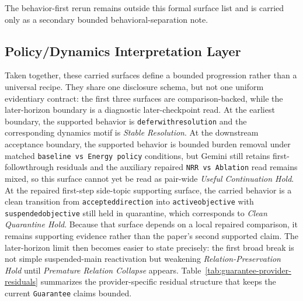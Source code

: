\documentclass[11pt]{article}
\renewcommand{\_}{\textunderscore\hspace{0pt}}
\begin{document}
The behavior-first rerun remains outside this formal surface list and is
carried only as a secondary bounded behavioral-separation note.

\subsection{Policy/Dynamics Interpretation Layer}

Taken together, these carried surfaces define a bounded progression rather than
a universal recipe. They share one disclosure schema, but not one uniform
evidentiary contract: the first three surfaces are comparison-backed, while the
later-horizon boundary is a diagnostic later-checkpoint read. At the earliest
boundary, the supported behavior is
\texttt{defer\_with\_resolution} and the corresponding dynamics motif is
\textit{Stable Resolution}. At the downstream acceptance boundary, the
supported behavior is bounded burden removal under matched \texttt{baseline vs
Energy policy} conditions, but Gemini still retains first-followthrough
residuals and the auxiliary repaired \texttt{NRR vs Ablation} read remains
mixed, so this surface cannot yet be read as pair-wide \textit{Useful
Continuation Hold}. At the repaired first-step side-topic supporting surface,
the carried behavior is a clean transition from
\texttt{accepted\_direction} into \texttt{active\_objective} with
\texttt{suspended\_objective} still held in quarantine, which corresponds to
\textit{Clean Quarantine Hold}. Because that surface depends on a local
repaired comparison, it remains supporting evidence rather than the paper's
second supported claim. The later-horizon limit then becomes easier to state
precisely: the first broad break is not simple suspended-main reactivation but
weakening \textit{Relation-Preservation Hold} until \textit{Premature
Relation Collapse} appears. Table~\ref{tab:guarantee-provider-residuals}
summarizes the provider-specific residual structure that keeps the current
\texttt{Guarantee} claims bounded.
\end{document}
